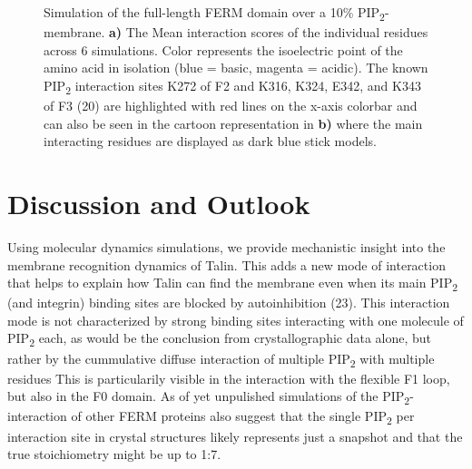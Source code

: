 \documentclass[
  twocolumn]{biophys-new-mod}
\begin{document}
\begin{figure}
\begin{minipage}[t]{\linewidth}
{}

\subcaption{\label{fig-ferm-memb-system}~}
\end{minipage}%

\caption{\label{fig-ferm-further}Simulation of the full-length FERM
domain over a 10\% PIP\textsubscript{2}-membrane. \textbf{a)} The Mean
interaction scores of the individual residues across 6 simulations.
Color represents the isoelectric point of the amino acid in isolation
(blue = basic, magenta = acidic). The known PIP\textsubscript{2}
interaction sites K272 of F2 and K316, K324, E342, and K343 of F3 (20)
are highlighted with red lines on the x-axis colorbar and can also be
seen in the cartoon representation in \textbf{b)} where the main
interacting residues are displayed as dark blue stick models.}

\end{figure}

\hypertarget{discussion-and-outlook}{%
\section{Discussion and Outlook}\label{discussion-and-outlook}}

Using molecular dynamics simulations, we provide mechanistic insight
into the membrane recognition dynamics of Talin. This adds a new mode of
interaction that helps to explain how Talin can find the membrane even
when its main PIP\textsubscript{2} (and integrin) binding sites are
blocked by autoinhibition (23). This interaction mode is not
characterized by strong binding sites interacting with one molecule of
PIP\textsubscript{2} each, as would be the conclusion from
crystallographic data alone, but rather by the cummulative diffuse
interaction of multiple PIP\textsubscript{2} with multiple residues This
is particularily visible in the interaction with the flexible F1 loop,
but also in the F0 domain. As of yet unpulished simulations of the
PIP\textsubscript{2}-interaction of other FERM proteins also suggest
that the single PIP\textsubscript{2} per interaction site in crystal
structures likely represents just a snapshot and that the true
stoichiometry might be up to 1:7.
\end{document}
